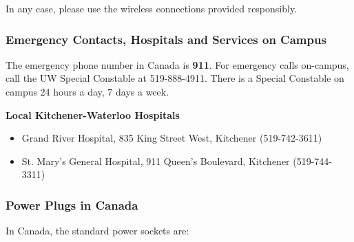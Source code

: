 
In any case, please use the wireless connections provided responsibly. 









\subsubsection{Emergency Contacts, Hospitals and Services on Campus}

The emergency phone number in Canada is \textbf{911}. For emergency calls on-campus, call the UW Special Constable at 519-888-4911. There is a Special Constable on campus 24 hours a day, 7 days a week.


\textbf{Local Kitchener-Waterloo Hospitals}

\begin{itemize}
    \item Grand River Hospital, 835 King Street West, Kitchener (519-742-3611)

    \item St. Mary’s General Hospital, 911 Queen’s Boulevard, Kitchener (519-744-3311)
\end{itemize}




\subsubsection{Power Plugs in Canada}

In Canada, the standard power sockets are:

